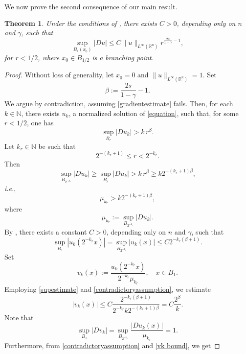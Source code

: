\documentclass[11pt,reqno]{amsart}
\newtheorem{theorem}{Theorem}
\numberwithin{equation}{section}
\numberwithin{theorem}{section}
\numberwithin{lemma}{section}
\numberwithin{corollary}{section}
\numberwithin{remark}{section}
\numberwithin{proposition}{section}
\numberwithin{definition}{section}
\newcommand{\R}{\mathbb{R}}
\begin{document}
We now prove the second consequence of our main result.

\begin{theorem}
Under the conditions of , there exists $C>0$, depending only on $n$ and $\gamma$, such that
\begin{equation}\label{gradientestimate}
    \sup_{B_r(x_0)}|Du|\le C\|u\|_{L^\infty(\R^n)}r^{\frac{2s}{1-\gamma}-1},
\end{equation}
for $r<1/2$, where $x_0\in B_{1/2}$ is a branching point.
\end{theorem}

\begin{proof}    
    Without loss of generality, let $x_0=0$ and $\|u\|_{L^\infty(\R^n)}=1$. Set 
    $$
    \beta:=\frac{2s}{1-\gamma}-1.
    $$
    We argue by contradiction, assuming \eqref{gradientestimate} fails. Then, for each $k\in\mathbb{N}$, there exists $u_k$, a normalized solution of \eqref{equation}, such that, for some $r<1/2$, one has
    $$
    \sup_{B_{r}}|Du_k|>k\,r^\beta.
    $$    
    Let $k_r\in\mathbb{N}$ be such that
    $$
    2^{-(k_r+1)}\le r<2^{-k_r}.
    $$
    Then
    $$
    \sup_{B_{2^{-k_r}}}|Du_k|\ge\sup_{B_r}|Du_k|>k\,r^\beta\ge k2^{-(k_r+1)\beta},
    $$
    \textit{i.e.},    
    \begin{equation}\label{contradictoryassumption}
        \mu_{k_r}>k2^{-(k_r+1)\beta}, 
    \end{equation}
    where
    $$
    \mu_{k_r}:=\sup_{B_{2^{-k_r}}}|Du_k|.
    $$    
    By , there exists a constant $C>0$, depending only on $n$ and $\gamma$, such that  
    \begin{equation}\label{supestimate}      
    \sup_{B_1}|u_k(2^{-k_r} x)|=\sup_{B_{2^{-k_r}}}|u_k(x)|\le C2^{-k_r(\beta+1)}.
    \end{equation}   
    Set      
    $$
    v_k(x):=\frac{u_k(2^{-k_r}x)}{2^{-k_r}\mu_{k_r}}, \quad x\in B_{1}.
    $$
    Employing \eqref{supestimate} and \eqref{contradictoryassumption}, we estimate
    \begin{equation}\label{vk bound}
    |v_k(x)|\le C\frac{2^{-k_r(\beta+1)}}{2^{-k_r}k2^{-(k_r+1)\beta}}=C\frac{2^\beta}{k}.
    \end{equation}    
    Note that
    \begin{equation}\label{sup of grad vk}      \sup_{B_{1}}|Dv_k|=\sup_{B_{2^{-k_r}}}\frac{|Du_k(x)|}{\mu_{k_r}}=1.
    \end{equation}    
   Furthermore, from \eqref{contradictoryassumption} and \eqref{vk bound}, we get

\end{proof}
\end{document}
